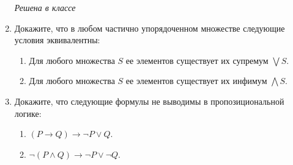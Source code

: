 \begin{enumerate}
\textit{Решена в классе}
\item Докажите, что в любом частично упорядоченном множестве следующие условия эквивалентны:
\begin{enumerate}
\item Для любого множества $S$ ее элементов существует их супремум $\bigvee S$.
\item Для любого множества $S$ ее элементов существует их инфимум $\bigwedge S$.
\end{enumerate}

\item Докажите, что следующие формулы не выводимы в пропозициональной логике:
\begin{enumerate}
\item $(P \to Q) \to \neg P \lor Q$.
\item $\neg (P \land Q) \to \neg P \lor \neg Q$.
\end{enumerate}

\end{enumerate}

